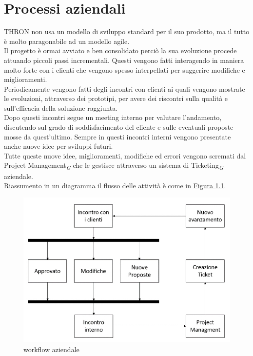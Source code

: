 \documentclass[a4paper, 12pt, twoside, openright]{book}
\newcommand{\gloss}[1]{#1\textsubscript{\textit{\tiny{G}}}}
\begin{document}
\section{Processi aziendali}
THRON non usa un modello di sviluppo standard per il suo prodotto, ma il tutto è molto paragonabile ad un modello agile.\\
Il progetto è ormai avviato e ben consolidato perciò la sua evoluzione procede attuando piccoli passi incrementali. Questi vengono fatti interagendo in maniera molto forte con i clienti che vengono spesso interpellati per suggerire modifiche e miglioramenti.\\
Periodicamente vengono fatti degli incontri con clienti ai quali vengono mostrate le evoluzioni, attraverso dei prototipi, per avere dei riscontri sulla qualità e sull'efficacia della soluzione raggiunta.\\
Dopo questi incontri segue un meeting interno per valutare l'andamento, discutendo sul grado di soddisfacimento del cliente e sulle eventuali proposte mosse da quest'ultimo. Sempre in questi incontri interni vengono presentate anche nuove idee per sviluppi futuri.\\
Tutte queste nuove idee, miglioramenti, modifiche ed errori vengono scremati dal \gloss{Project Management} che le gestisce attraverso un \gloss{sistema di Ticketing} aziendale.\\
Riassumento in un diagramma il flusso delle attività è come in \hyperref[thron-workflow]{Figura 1.1}. 
\begin{figure}[H]
	\centering
	\label{thron-workflow}
	\includegraphics[width=1.0\textwidth]{images/thron-workflow.jpg}
	\caption{workflow aziendale}
\end{figure}
\end{document}
